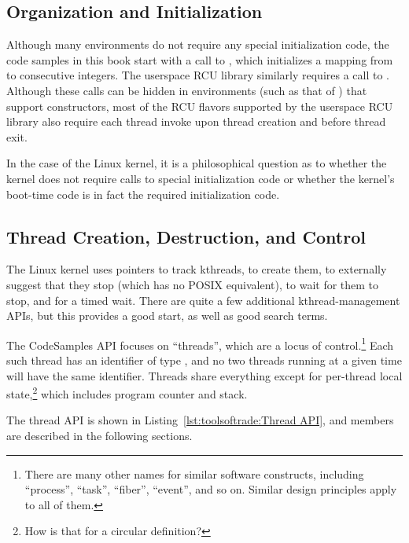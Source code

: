 \subsection{Organization and Initialization}
\label{sec:toolsoftrade:Organization and Initialization}

Although many environments do not require any special initialization
code, the code samples in this book start with a call to ,
which initializes a mapping from  to consecutive integers.
The userspace RCU library similarly requires a call to .
Although these calls can be hidden in environments (such as that of
\GCC) that support constructors,
most of the RCU flavors supported by the userspace RCU library
also require each thread invoke  upon thread
creation and  before thread exit.

In the case of the Linux kernel, it is a philosophical question as to
whether the kernel does not require calls to special initialization
code or whether the kernel's boot-time code is in fact the required
initialization code.

\subsection{Thread Creation, Destruction, and Control}
\label{sec:toolsoftrade:Thread Creation, Destruction, and Control}

The Linux kernel uses
 pointers to track kthreads,
 to create them,
 to externally suggest that they stop
(which has no POSIX equivalent),
 to wait for them to stop, and
 for a timed wait.
There are quite a few additional kthread-management APIs, but this
provides a good start, as well as good search terms.

The CodeSamples API focuses on ``threads'', which are a locus of
control.\footnote{
	There are many other names for similar software constructs, including
	``process'', ``task'', ``fiber'', ``event'', and so on.
	Similar design principles apply to all of them.}
Each such thread has an identifier of type ,
and no two threads running at a given time will have the same
identifier.
Threads share everything except for per-thread local state,\footnote{
	How is that for a circular definition?}
which includes program counter and stack.

The thread API is shown in
Listing~\ref{lst:toolsoftrade:Thread API}, and members are described in the
following sections.

